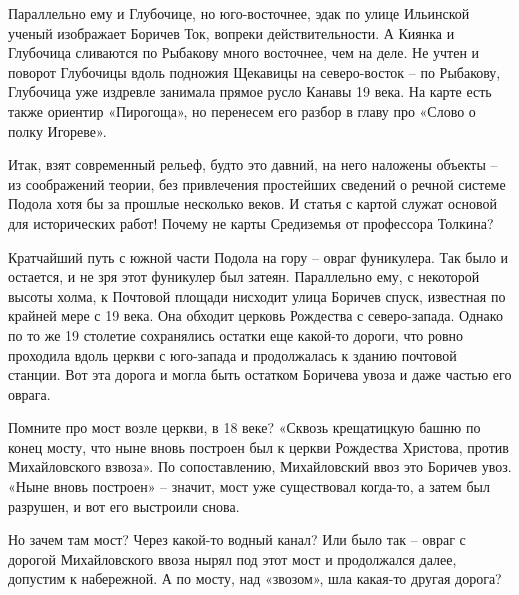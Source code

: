Параллельно ему и Глубочице, но юго-восточнее, эдак по улице Ильинской ученый изображает Боричев Ток, вопреки действительности. А Киянка и Глубочица сливаются по Рыбакову много восточнее, чем на деле. Не учтен и поворот Глубочицы вдоль подножия Щекавицы на северо-восток – по Рыбакову, Глубочица уже издревле занимала прямое русло Канавы 19 века. На карте есть также ориентир «Пирогоща», но перенесем его разбор в главу про «Слово о полку Игореве». 

Итак, взят современный рельеф, будто это давний, на него наложены объекты – из соображений теории, без привлечения простейших сведений о речной системе Подола хотя бы за прошлые несколько веков. И статья с картой служат основой для исторических работ! Почему не карты Средиземья от профессора Толкина?

Кратчайший путь с южной части Подола на гору – овраг фуникулера. Так было и остается, и не зря этот фуникулер был затеян. Параллельно ему, с некоторой высоты холма, к Почтовой площади нисходит улица Боричев спуск, известная по крайней мере с 19 века. Она обходит церковь Рождества с северо-запада. Однако по то же 19 столетие сохранялись остатки еще какой-то дороги, что ровно проходила вдоль церкви с юго-запада и продолжалась к зданию почтовой станции. Вот эта дорога и могла быть остатком Боричева увоза и даже частью его оврага. 

Помните про мост возле церкви, в 18 веке? «Сквозь крещатицкую башню по конец мосту, что ныне вновь построен был к церкви Рождества Христова, против Михайловского взвоза». По сопоставлению, Михайловский ввоз это Боричев увоз. «Ныне вновь построен» – значит, мост уже существовал когда-то, а затем был разрушен, и вот его выстроили снова.

Но зачем там мост? Через какой-то водный канал? Или было так – овраг с дорогой Михайловского ввоза нырял под этот мост и продолжался далее, допустим к набережной. А по мосту, над «звозом», шла какая-то другая дорога?






